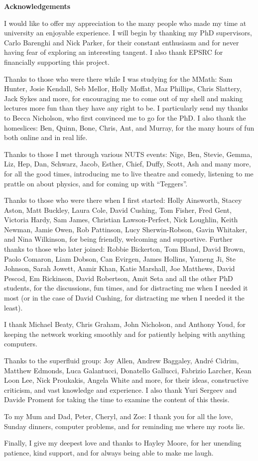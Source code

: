 \begin{center}
{\bf Acknowledgements}
\end{center}
\noindent
I would like to offer my appreciation to the many people who made my time at university an enjoyable experience. I will begin by thanking my PhD supervisors, Carlo Barenghi and Nick Parker, for their constant enthusiasm and for never having fear of exploring an interesting tangent. I also thank EPSRC for financially supporting this project.

Thanks to those who were there while I was studying for the MMath: Sam Hunter, Josie Kendall, Seb Mellor, Holly Moffat, Maz Phillips, Chris Slattery, Jack Sykes and more, for encouraging me to come out of my shell and making lectures more fun than they have any right to be. I particularly send my thanks to Becca Nicholson, who first convinced me to go for the PhD. I also thank the homeslices: Ben, Quinn, Bone, Chris, Ant, and Murray, for the many hours of fun both online and in real life.

Thanks to those I met through various NUTS events: Nige, Ben, Stevie, Gemma, Liz, Hep, Dan, Schwarz, Jacob, Esther, Chief, Duffy, Scott, Ash and many more, for all the good times, introducing me to live theatre and comedy, listening to me prattle on about physics, and for coming up with ``Teggers''. 

Thanks to those who were there when I first started: Holly Ainsworth, Stacey Aston, Matt Buckley, Laura Cole, David Cushing, Tom Fisher, Fred Gent, Victoria Hardy, Sam James, Christian Lawson-Perfect, Nick Loughlin, Keith Newman, Jamie Owen, Rob Pattinson, Lucy Sherwin-Robson, Gavin Whitaker, and Nina Wilkinson, for being friendly, welcoming and supportive. Further thanks to those who later joined: Robbie Bickerton, Tom Bland, David Brown, Paolo Comaron, Liam Dobson, Can Evirgen, James Hollins, Yameng Ji, Ste Johnson, Sarah Jowett, Aamir Khan, Katie Marshall, Joe Matthews, David Pescod, Em Rickinson, David Robertson, Amit Seta and all the other PhD students, for the discussions, fun times, and for distracting me when I needed it most (or in the case of David Cushing, for distracting me when I needed it the least).

I thank Michael Beaty, Chris Graham, John Nicholson, and Anthony Youd, for keeping the network working smoothly and for patiently helping with anything computers.

Thanks to the superfluid group: Joy Allen, Andrew Baggaley, Andr\'e Cidrim, Matthew Edmonds, Luca Galantucci, Donatello Gallucci, Fabrizio Larcher, Kean Loon Lee, Nick Proukakis, Angela White and more, for their ideas, constructive criticism, and vast knowledge and experience. I also thank Yuri Sergeev and Davide Proment for taking the time to examine the content of this thesis.

To my Mum and Dad, Peter, Cheryl, and Zoe: I thank you for all the love, Sunday dinners, computer problems, and for reminding me where my roots lie.

Finally, I give my deepest love and thanks to Hayley Moore, for her unending patience, kind support, and for always being able to make me laugh.
\thispagestyle{plain}
\restoregeometry
